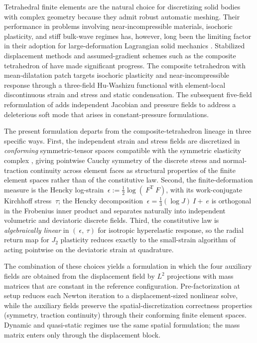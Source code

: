 \documentclass[12pt]{article}
\newcommand{\F}{~F}
\newcommand{\eps}{~\epsilon}
\newcommand{\edev}{~e}
\newcommand{\btau}{~\tau}
\newcommand{\transpose}[1]{{#1}^{\mathrm{T}}}
\begin{document}
Tetrahedral finite elements are the natural choice for discretizing
solid bodies with complex geometry because they admit robust
automatic meshing. Their performance in problems involving
near-incompressible materials, isochoric plasticity, and stiff
bulk-wave regimes has, however, long been the limiting factor in
their adoption for large-deformation Lagrangian solid mechanics
\citep{Thoutireddy.etal:2002, Puso.Solberg:2006, Irving.etal:2007,
Danielson:2014, Scovazzi:2015}. Stabilized displacement methods
\citep{Klaas:1999, Maniatty:2002, Scovazzi:2015} and assumed-gradient
schemes such as the composite tetrahedron of \citet{Ostien.etal:2016}
have made significant progress. The composite tetrahedron with
mean-dilatation patch targets isochoric plasticity and
near-incompressible response through a three-field Hu-Washizu
functional with element-local discontinuous strain and stress and
static condensation. The subsequent five-field reformulation of
\citet{Foulk.etal:2021} adds independent Jacobian and pressure fields
to address a deleterious soft mode that arises in constant-pressure
formulations.

The present formulation departs from the composite-tetrahedron
lineage in three specific ways. First, the independent strain and
stress fields are discretized in \emph{conforming} symmetric-tensor
spaces compatible with the symmetric elasticity complex
\citep{Arnold.Falk.Winther:2006a, Arnold.Falk.Winther:2010}, giving
pointwise Cauchy symmetry of the discrete stress and normal-traction
continuity across element faces as structural properties of the
finite element spaces rather than of the constitutive law. Second,
the finite-deformation measure is the Hencky log-strain
$\eps := \tfrac{1}{2}\log(\transpose{\F}\F)$, with its work-conjugate
Kirchhoff stress $\btau$; the Hencky decomposition
$\eps = \tfrac{1}{3}(\log J)~I + \edev$ is orthogonal in the
Frobenius inner product and separates naturally into independent
volumetric and deviatoric discrete fields. Third, the constitutive
law is \emph{algebraically linear} in $(\eps, \btau)$ for isotropic
hyperelastic response, so the radial return map for $J_2$ plasticity
reduces exactly to the small-strain algorithm of \citet{Simo:1992}
acting pointwise on the deviatoric strain at quadrature.

The combination of these choices yields a formulation in which the
four auxiliary fields are obtained from the displacement field by
$L^2$ projections with mass matrices that are constant in the
reference configuration. Pre-factorization at setup reduces each
Newton iteration to a displacement-sized nonlinear solve, while the
auxiliary fields preserve the spatial-discretization correctness
properties (symmetry, traction continuity) through their conforming
finite element spaces. Dynamic and quasi-static regimes use the same
spatial formulation; the mass matrix enters only through the
displacement block.
\end{document}
